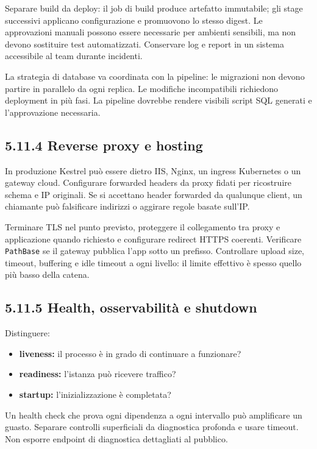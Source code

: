 \documentclass[
  italian,
  10pt,
]{book}
\providecommand{\tightlist}{%
  \setlength{\itemsep}{0pt}\setlength{\parskip}{0pt}}
\begin{document}
Separare build da deploy: il job di build produce artefatto immutabile;
gli stage successivi applicano configurazione e promuovono lo stesso
digest. Le approvazioni manuali possono essere necessarie per ambienti
sensibili, ma non devono sostituire test automatizzati. Conservare log e
report in un sistema accessibile al team durante incidenti.

La strategia di database va coordinata con la pipeline: le migrazioni
non devono partire in parallelo da ogni replica. Le modifiche
incompatibili richiedono deployment in più fasi. La pipeline dovrebbe
rendere visibili script SQL generati e l'approvazione necessaria.

\subsection{5.11.4 Reverse proxy e
hosting}\label{reverse-proxy-e-hosting}

In produzione Kestrel può essere dietro IIS, Nginx, un ingress
Kubernetes o un gateway cloud. Configurare forwarded headers da proxy
fidati per ricostruire schema e IP originali. Se si accettano header
forwarded da qualunque client, un chiamante può falsificare indirizzi o
aggirare regole basate sull'IP.

Terminare TLS nel punto previsto, proteggere il collegamento tra proxy e
applicazione quando richiesto e configurare redirect HTTPS coerenti.
Verificare \texttt{PathBase} se il gateway pubblica l'app sotto un
prefisso. Controllare upload size, timeout, buffering e idle timeout a
ogni livello: il limite effettivo è spesso quello più basso della
catena.

\subsection{5.11.5 Health, osservabilità e
shutdown}\label{health-osservabilituxe0-e-shutdown}

Distinguere:

\begin{itemize}
\tightlist
\item
  \textbf{liveness:} il processo è in grado di continuare a funzionare?
\item
  \textbf{readiness:} l'istanza può ricevere traffico?
\item
  \textbf{startup:} l'inizializzazione è completata?
\end{itemize}

Un health check che prova ogni dipendenza a ogni intervallo può
amplificare un guasto. Separare controlli superficiali da diagnostica
profonda e usare timeout. Non esporre endpoint di diagnostica
dettagliati al pubblico.
\end{document}
